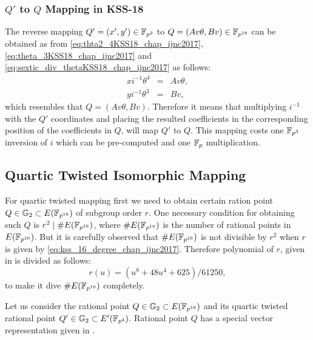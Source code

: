 \subsubsection{\texorpdfstring{$Q'$}{} to \texorpdfstring{$Q$}{} Mapping in KSS-18}
 The reverse mapping $Q' =(x',y') \in \mathbb{F}_{p^3}$ to $Q =(Av\theta,Bv) \in \mathbb{F}_{p^{18}}$ can be obtained as from \eqref{eq:thta2_4KSS18_chap_ijnc2017}, \eqref{eq:theta_3KSS18_chap_ijnc2017} and \eqref{eq:sextic_div_thetaKSS18_chap_ijnc2017} as follows:
 \begin{subequations}
 \begin{eqnarray}
 x i^{-1}\theta^{4} & = & Av\theta, \nonumber \\
 y i^{-1}\theta^{3} & = & Bv, \nonumber
 \end{eqnarray}
 \end{subequations}
  which resembles that $Q= (Av\theta, Bv)$. Therefore it means that multiplying $i^{-1}$ with the $Q'$ coordinates and placing the resulted coefficients in the corresponding position of the coefficients in $Q$, will map $Q'$ to $Q$.
This mapping costs one $\mathbb{F}_{p^3}$ inversion of $i$ which can be pre-computed and one ${\mathbb{F}}_{p}$ multiplication.

\subsection{Quartic Twisted Isomorphic Mapping}
\label{sec:ch:ijnc:kss16twist_isomorphicmap}

For quartic twisted mapping first we need to obtain certain ration point  $Q \in {\mathbb{G}}_{2} \subset E(\mathbb{F}_{p^{16}})$ of subgroup order $r$. 
One necessary condition for obtaining such $Q$ is $r^2 \mid \#E(\mathbb{F}_{p^{16}})$, where $\#E(\mathbb{F}_{p^{16}})$ is the number of rational points in $E(\mathbb{F}_{p^{16}})$.  But it is carefully observed that $\#E(\mathbb{F}_{p^{16}})$ is not divisible by $r^2$ when $r$ is given by \eqref{eq:kss_16_degree_chap_ijnc2017}.
 Therefore polynomial of $r$, given in \cite{EPRINT:KacSchSco07} is divided as follows:
\begin{equation}
r(u) =  (u^8 +48u^4 +625)/61250,
\end{equation}
to make it dive  $\#E(\mathbb{F}_{p^{16}})$ completely.

Let us consider the rational point $Q \in {\mathbb{G}}_{2} \subset E(\mathbb{F}_{p^{16}})$ and its quartic twisted rational point $Q' \in {\mathbb{G}}_{2} \subset E'(\mathbb{F}_{p^4})$. Rational point $Q$ has a special vector representation given in  .

